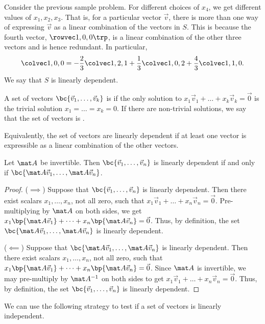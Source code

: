 Consider the previous sample problem. For different choices of $x_4$, we get different values of $x_1, x_2, x_3$. That is, for a particular vector $\vec v$, there is more than one way of expressing $\vec v$ as a linear combination of the vectors in $S$. This is because the fourth vector, $\cveciiix100$, is a linear combination of the other three vectors and is hence redundant. In particular, \[\cveciii100 = -\frac23 \cveciii121 + \frac13 \cveciii102 + \frac43 \cveciii110.\] We say that $S$ is linearly dependent.

\begin{definition}
    A set of vectors $\bc{\vec v_1, \dots, \vec v_k}$ is  if the only solution to $x_1 \vec v_1 + \dots + x_k \vec v_k = \vec 0$ is the trivial solution $x_1 = \dots = x_k = 0$. If there are non-trivial solutions, we say that the set of vectors is .
\end{definition}

Equivalently, the set of vectors are linearly dependent if at least one vector is expressible as a linear combination of the other vectors.

\begin{proposition}\label{prop:lin-alg-lin-dep-inv}
    Let $\mat A$ be invertible. Then $\bc{\vec v_1, \dots, \vec v_n}$ is linearly dependent if and only if $\bc{\mat A \vec v_1, \dots, \mat A \vec v_n}$.
\end{proposition}
\begin{proof}
    ($\implies$) Suppose that $\bc{\vec v_1, \dots, \vec v_n}$ is linearly dependent. Then there exist scalars $x_1, \dots, x_n$, not all zero, such that $x_1 \vec v_1 + \dots + x_n \vec v_n = \vec 0$. Pre-multiplying by $\mat A$ on both sides, we get $x_1 \bp{\mat A \vec v_1} + \dots + x_n \bp{\mat A \vec v_n} = \vec 0$. Thus, by definition, the set $\bc{\mat A \vec v_1, \dots, \mat A \vec v_n}$ is linearly dependent.

    ($\impliedby$) Suppose that $\bc{\mat A \vec v_1, \dots, \mat A \vec v_n}$ is linearly dependent. Then there exist scalars $x_1, \dots, x_n$, not all zero, such that $x_1 \bp{\mat A \vec v_1} + \dots + x_n \bp{\mat A \vec v_n} = \vec 0$. Since $\mat A$ is invertible, we may pre-multiply by $\mat A^{-1}$ on both sides to get $x_1 \vec v_1 + \dots + x_n \vec v_n = \vec 0$. Thus, by definition, the set $\bc{\vec v_1, \dots, \vec v_n}$ is linearly dependent.
\end{proof}

We can use the following strategy to test if a set of vectors is linearly independent.

